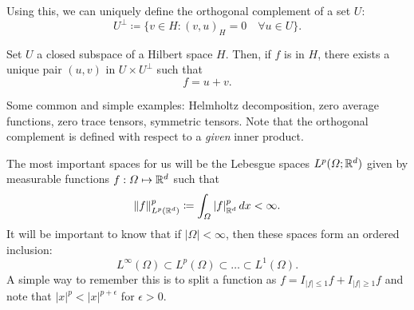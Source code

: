Using this, we can uniquely define the orthogonal complement of a set $U$: 
    \begin{equation}\label{eq:orthogonal-complement}
    U^\perp \coloneqq \{v\in H: (v, u)_H = 0 \quad\forall u\in U\}.
    \end{equation}
\begin{theorem}\label{thm:orthogonal-decomposition} 
    Set $U$ a closed subspace of a Hilbert space $H$. Then, if $f$ is in $H$, there exists a unique pair $(u,v)$ in $U\times U^\perp$ such that 
        \begin{equation}\label{eq:orthogonal-decomposition} 
        f = u + v.
        \end{equation}
\end{theorem}
Some common and simple examples: Helmholtz decomposition, zero average functions, zero trace tensors, symmetric tensors. Note that the orthogonal complement is defined with respect to a \emph{given} inner product.\\


The most important spaces for us will be the Lebesgue spaces $L^p(\Omega;\mathbb{R}^d)$ given by measurable functions $f:\Omega \mapsto \mathbb{R}^d$ such that
\begin{equation}\label{eq:lebesgue-norm}
\|f\|_{L^p(\mathbb{R}^d)}^p \coloneqq \int_\Omega |f|_{\mathbb{R}^d}^p\,dx < \infty.
\end{equation}
It will be important to know that if $|\Omega|<\infty$, then these spaces form an ordered inclusion: 
    \begin{equation*}
    L^\infty(\Omega) \subset L^p(\Omega) \subset \dots \subset L^1(\Omega).
    \end{equation*}
A simple way to remember this is to split a function as $f = I_{|f|\leq 1}f + I_{|f|\geq 1}f$ and note that $|x|^p < |x|^{p+\epsilon}$ for $\epsilon > 0$. 

